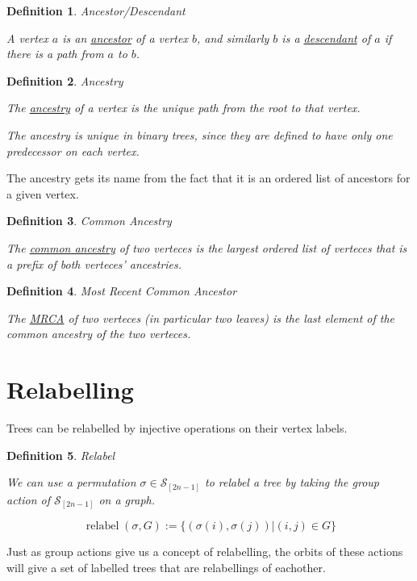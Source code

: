\documentclass[10pt,a4paper]{report}
\DeclareMathOperator{\relabel}{relabel}
\newcommand{\Sym}{\mathcal{S}}
\newtheorem{definition}{Definition}
\begin{document}
\begin{definition} Ancestor/Descendant

	A vertex $a$ is an \underline{ancestor} of a vertex $b$, and similarly $b$ is a
	\underline{descendant} of $a$ if there is a path from $a$ to $b$.
\end{definition}

\begin{definition} Ancestry

	The \underline{ancestry} of a vertex is the unique path from the root to that vertex.

	The ancestry is unique in binary trees, since they are defined to have only
	one predecessor on each vertex.
\end{definition}

The ancestry gets its name from the fact that it is an ordered list of
ancestors for a given vertex.

\begin{definition} Common Ancestry

	The \underline{common ancestry} of two verteces is the largest ordered list of verteces
	that is a prefix of both verteces' ancestries.
\end{definition}

\begin{definition} Most Recent Common Ancestor

	The \underline{MRCA} of two verteces (in particular two leaves) is the last element of
	the common ancestry of the two verteces.
\end{definition}

\section{Relabelling}

Trees can be relabelled by injective operations on their vertex labels.

\begin{definition} Relabel

	We can use a permutation $\sigma \in \Sym_[2n-1]$ to relabel a tree by taking
	the group action of $\Sym_[2n-1]$ on a graph.

	\[
		\relabel(\sigma, G) := \{(\sigma(i), \sigma(j)) | (i, j) \in G\}
	\]
\end{definition}

Just as group actions give us a concept of relabelling, the orbits of these
actions will give a set of labelled trees that are relabellings of eachother.
\end{document}

